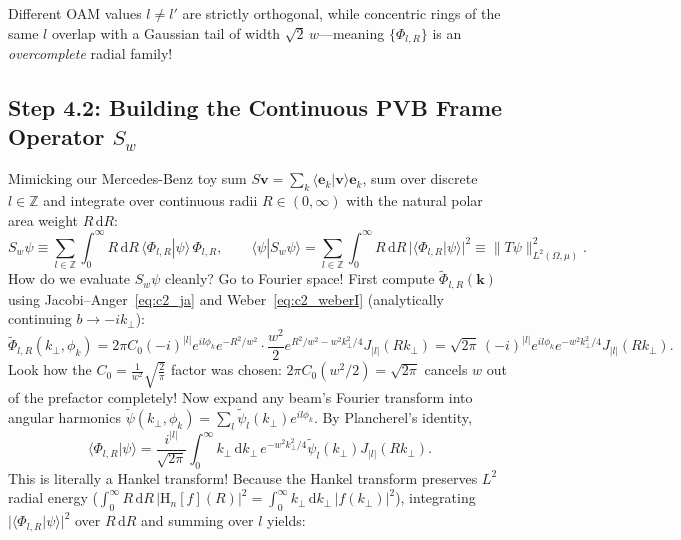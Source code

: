 \documentclass[10pt,letterpaper]{article}
\newcommand{\braket}[2]{\langle #1 | #2 \rangle}
\newcommand{\norm}[1]{\lVert #1 \rVert}
\newcommand{\abs}[1]{\lvert #1 \rvert}
\newcommand{\dd}{\mathrm{d}}
\numberwithin{equation}{section}
\begin{document}
Different OAM values $l \neq l'$ are strictly orthogonal, while concentric rings of the same $l$ overlap with a Gaussian tail of width $\sqrt{2}\,w$---meaning $\{\Phi_{l,R}\}$ is an \emph{overcomplete} radial family!

\subsection{Step 4.2: Building the Continuous PVB Frame Operator $S_w$}

Mimicking our Mercedes-Benz toy sum $S\mathbf{v} = \sum_k \braket{\mathbf{e}_k}{\mathbf{v}}\mathbf{e}_k$, sum over discrete $l \in \mathbb{Z}$ and integrate over continuous radii $R \in (0,\infty)$ with the natural polar area weight $R\,\dd R$:
\begin{equation}
  S_w\psi \equiv \sum_{l\in\mathbb{Z}}\int_0^\infty R\,\dd R\,\braket{\Phi_{l,R}}{\psi}\,\Phi_{l,R}, \qquad
  \braket{\psi}{S_w\psi} = \sum_{l\in\mathbb{Z}}\int_0^\infty R\,\dd R\,\abs{\braket{\Phi_{l,R}}{\psi}}^2 \equiv \norm{T\psi}_{L^2(\Omega,\mu)}^2.
\end{equation}
How do we evaluate $S_w\psi$ cleanly? Go to Fourier space! First compute $\widetilde{\Phi}_{l,R}(\mathbf{k})$ using Jacobi--Anger~\eqref{eq:c2_ja} and Weber~\eqref{eq:c2_weberI} (analytically continuing $b \to -ik_\perp$):
\begin{equation}
  \widetilde{\Phi}_{l,R}(k_\perp,\phi_k) = 2\pi C_0 (-i)^{\abs{l}} e^{il\phi_k} e^{-R^2/w^2} \cdot \frac{w^2}{2} e^{R^2/w^2 - w^2 k_\perp^2/4} J_{\abs{l}}(Rk_\perp) = \sqrt{2\pi}\,(-i)^{\abs{l}} e^{il\phi_k} e^{-w^2 k_\perp^2/4} J_{\abs{l}}(Rk_\perp).
\end{equation}
Look how the $C_0 = \frac{1}{w^2}\sqrt{\frac{2}{\pi}}$ factor was chosen: $2\pi C_0(w^2/2) = \sqrt{2\pi}$ cancels $w$ out of the prefactor completely! Now expand any beam's Fourier transform into angular harmonics $\widetilde{\psi}(k_\perp,\phi_k) = \sum_l \widetilde{\psi}_l(k_\perp) e^{il\phi_k}$. By Plancherel's identity,
\begin{equation}
  \braket{\Phi_{l,R}}{\psi} = \frac{i^{\abs{l}}}{\sqrt{2\pi}}\int_0^\infty k_\perp\,\dd k_\perp\,e^{-w^2 k_\perp^2/4}\widetilde{\psi}_l(k_\perp) J_{\abs{l}}(Rk_\perp).
\end{equation}
This is literally a Hankel transform! Because the Hankel transform preserves $L^2$ radial energy ($\int_0^\infty R\,\dd R\,\abs{\mathrm{H}_n[f](R)}^2 = \int_0^\infty k_\perp\,\dd k_\perp\,\abs{f(k_\perp)}^2$), integrating $\abs{\braket{\Phi_{l,R}}{\psi}}^2$ over $R\,\dd R$ and summing over $l$ yields:
\end{document}
